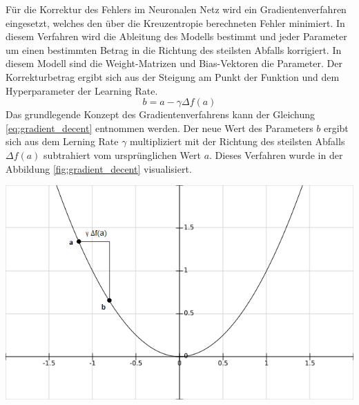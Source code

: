 \documentclass[Interploate_hadwritten_Digits.tex]{subfiles}
\begin{document}
	Für die Korrektur des Fehlers im Neuronalen Netz wird ein Gradientenverfahren eingesetzt, welches den über die Kreuzentropie berechneten Fehler minimiert. In diesem Verfahren wird die Ableitung des Modells bestimmt und jeder Parameter um einen bestimmten Betrag in die Richtung des steilsten Abfalls korrigiert. In diesem Modell sind die Weight-Matrizen und Bias-Vektoren die Parameter. Der Korrekturbetrag ergibt sich aus der Steigung am Punkt der Funktion und dem Hyperparameter der Learning Rate.
	\begin{equation}
	b = a - \gamma \Delta f(a)
	\label{eq:gradient_decent}
	\end{equation}
	Das grundlegende Konzept des Gradientenverfahrens kann der Gleichung \ref{eq:gradient_decent} entnommen werden. Der neue Wert des Parameters $ b $ ergibt sich aus dem Lerning Rate $ \gamma $ multipliziert mit der Richtung des steilsten Abfalls $ \Delta f(a) $ subtrahiert vom ursprünglichen Wert $ a $. Dieses Verfahren wurde in der Abbildung \ref{fig:gradient_decent} visualisiert.
	\begin{Figure}
		\centering
		\includegraphics[width=\linewidth]{img/gradient_decent.png}
		\label{fig:gradient_decent}
	\end{Figure}
	
\end{document}
